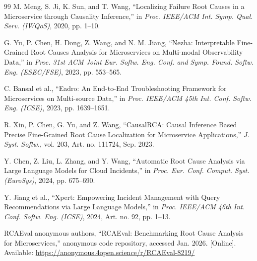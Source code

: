 \documentclass[conference]{IEEEtran}
\begin{document}
\begin{thebibliography}{99}
M. Meng, S. Ji, K. Sun, and T. Wang,
``Localizing Failure Root Causes in a Microservice through Causality Inference,''
in \textit{Proc. IEEE/ACM Int. Symp. Qual. Serv. (IWQoS)}, 2020, pp. 1--10.

G. Yu, P. Chen, H. Dong, Z. Wang, and N. M. Jiang,
``Nezha: Interpretable Fine-Grained Root Causes Analysis for Microservices on Multi-modal Observability Data,''
in \textit{Proc. 31st ACM Joint Eur. Softw. Eng. Conf. and Symp. Found. Softw. Eng. (ESEC/FSE)}, 2023, pp. 553--565.

C. Bansal et al.,
``Eadro: An End-to-End Troubleshooting Framework for Microservices on Multi-source Data,''
in \textit{Proc. IEEE/ACM 45th Int. Conf. Softw. Eng. (ICSE)}, 2023, pp. 1639--1651.

R. Xin, P. Chen, G. Yu, and Z. Wang,
``CausalRCA: Causal Inference Based Precise Fine-Grained Root Cause Localization for Microservice Applications,''
\textit{J. Syst. Softw.}, vol. 203, Art. no. 111724, Sep. 2023.

Y. Chen, Z. Liu, L. Zhang, and Y. Wang,
``Automatic Root Cause Analysis via Large Language Models for Cloud Incidents,''
in \textit{Proc. Eur. Conf. Comput. Syst. (EuroSys)}, 2024, pp. 675--690.

Y. Jiang et al.,
``Xpert: Empowering Incident Management with Query Recommendations via Large Language Models,''
in \textit{Proc. IEEE/ACM 46th Int. Conf. Softw. Eng. (ICSE)}, 2024, Art. no. 92, pp. 1--13.

RCAEval anonymous authors,
``RCAEval: Benchmarking Root Cause Analysis for Microservices,''
anonymous code repository, accessed Jan. 2026. [Online]. Available: \url{https://anonymous.4open.science/r/RCAEval-8219/}

\end{thebibliography}
\end{document}
